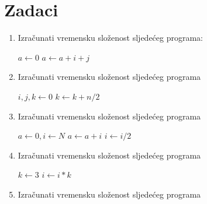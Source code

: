 \section*{Zadaci}

\begin{enumerate}
	\item Izračunati vremensku složenost sljedećeg programa:
	
	\begin{algorithm}[H]
		\begin{algorithmic}[1]
		    \State $ a \gets  0$
		    		\State $a \gets  a + i + j$
		         \EndFor
		     \EndFor
	    \EndProcedure	 	    
		\end{algorithmic}
	\end{algorithm}
\item Izračunati vremensku složenost sljedećeg programa 
	\begin{algorithm}[H]
	\begin{algorithmic}[1]
		\State $i, j, k \gets  0$
				\State $k \gets  k + n / 2$
			\EndFor
		\EndFor
	\EndProcedure	 
	\end{algorithmic}
\end{algorithm}
 \item Izračunati vremensku složenost sljedećeg programa 

	\begin{algorithm}[H]
	\begin{algorithmic}[1]
		\State $a \gets 0, i \gets N$
			\State $a \gets a+ i$
			\State $i \gets i / 2$
		\EndWhile
    \EndProcedure	 
	\end{algorithmic}
\end{algorithm}
 \item Izračunati vremensku složenost sljedećeg programa 

\begin{algorithm}[H]
	\begin{algorithmic}[1]
		\State $k \gets 3$
		    \State $i \gets i * k$
		\EndFor
	   \EndProcedure
	\end{algorithmic}
\end{algorithm}

 \item Izračunati vremensku složenost sljedećeg programa 


\end{enumerate}
